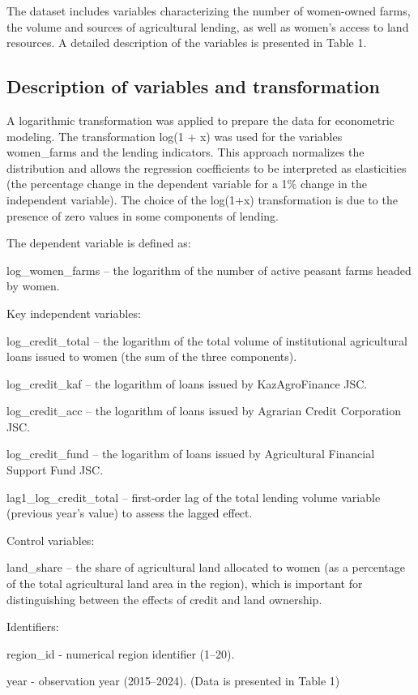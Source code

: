 \documentclass[pdflatex,sn-mathphys-ay]{sn-jnl}
\begin{document}
The dataset includes variables characterizing the number of women-owned
farms, the volume and sources of agricultural lending, as well as
women's access to land resources. A detailed description of the
variables is presented in Table 1.

\subsection{Description of variables and transformation}

A logarithmic transformation was applied to prepare the data for
econometric modeling. The transformation log(1 + x) was used for the
variables women\_farms and the lending indicators. This approach
normalizes the distribution and allows the regression coefficients to be
interpreted as elasticities (the percentage change in the dependent
variable for a 1\% change in the independent variable). The choice of
the log(1+x) transformation is due to the presence of zero values in
some components of lending.

The dependent variable is defined as:

log\_women\_farms -- the logarithm of the number of active peasant farms
headed by women.

Key independent variables:

log\_credit\_total -- the logarithm of the total volume of institutional
agricultural loans issued to women (the sum of the three components).

log\_credit\_kaf -- the logarithm of loans issued by KazAgroFinance JSC.

log\_credit\_acc -- the logarithm of loans issued by Agrarian Credit
Corporation JSC.

log\_credit\_fund -- the logarithm of loans issued by Agricultural
Financial Support Fund JSC.

lag1\_log\_credit\_total -- first-order lag of the total lending volume
variable (previous year's value) to assess the lagged effect.

Control variables:

land\_share -- the share of agricultural land allocated to women (as a
percentage of the total agricultural land area in the region), which is
important for distinguishing between the effects of credit and land
ownership.

Identifiers:

region\_id - numerical region identifier (1--20).

year - observation year (2015--2024). (Data is presented in Table 1)
\end{document}

